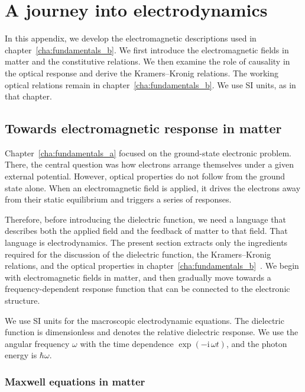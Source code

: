 \chapter{A journey into electrodynamics}
\label{cha:appendix_electrodynamics}

In this appendix, we develop the electromagnetic descriptions used in chapter~\ref{cha:fundamentals_b}.
We first introduce the electromagnetic fields in matter and the constitutive relations.
We then examine the role of causality in the optical response and derive the Kramers--Kronig relations.
The working optical relations remain in chapter~\ref{cha:fundamentals_b}.
We use SI units, as in that chapter.

\newpage
\section{Towards electromagnetic response in matter}
\label{sec:toward_electromagnetic_response_in_matter}

Chapter~\ref{cha:fundamentals_a} focused on the ground-state electronic problem.
There, the central question was how electrons arrange themselves under a given external potential.
However, optical properties do not follow from the ground state alone.
When an electromagnetic field is applied,
it drives the electrons away from their static equilibrium and triggers a series of responses.

Therefore, before introducing the dielectric function, we need a language that describes both the applied field and the feedback of matter to that field.
That language is electrodynamics.
The present section extracts only the ingredients required for the discussion of the dielectric function, the Kramers--Kronig relations, and the optical properties in chapter~\ref{cha:fundamentals_b}~\cite{landau2013electrodynamics,griffiths2023introduction}.
We begin with electromagnetic fields in matter, and then gradually move towards a frequency-dependent response function that can be connected to the electronic structure.

We use SI units for the macroscopic electrodynamic equations.
The dielectric function is dimensionless and denotes the relative dielectric response.
We use the angular frequency $\omega$ with the time dependence $\exp(-\mathrm{i}\,\omega t)$,
and the photon energy is $\hbar\omega$.

\subsection{Maxwell equations in matter}

